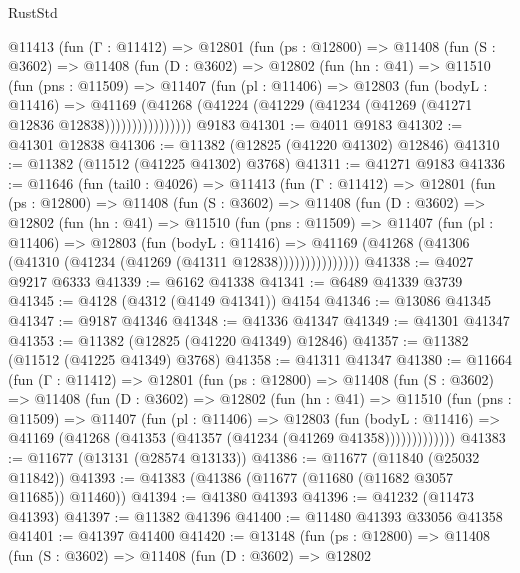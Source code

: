 \begin{lexlean}{RustStd}
\begin{coremodule}
      @11413
        (fun (Γ : @11412) =>
        @12801
          (fun (ps : @12800) =>
          @11408
            (fun (S : @3602) =>
            @11408
              (fun (D : @3602) =>
              @12802
                (fun (hn : @41) =>
                @11510
                  (fun (pns : @11509) =>
                  @11407
                    (fun (pl : @11406) =>
                    @12803
                      (fun (bodyL : @11416) =>
                      @41169
                        (@41268
                          (@41224 (@41229 (@41234 (@41269 (@41271 @12836 @12838))))))))))))))))
    @9183
@41301 := @4011 @9183
@41302 := @41301 @12838
@41306 := @11382 (@12825 (@41220 @41302) @12846)
@41310 := @11382 (@11512 (@41225 @41302) @3768)
@41311 := @41271 @9183
@41336 := @11646
    (fun (tail0 : @4026) =>
    @11413
      (fun (Γ : @11412) =>
      @12801
        (fun (ps : @12800) =>
        @11408
          (fun (S : @3602) =>
          @11408
            (fun (D : @3602) =>
            @12802
              (fun (hn : @41) =>
              @11510
                (fun (pns : @11509) =>
                @11407
                  (fun (pl : @11406) =>
                  @12803
                    (fun (bodyL : @11416) =>
                    @41169 (@41268 (@41306 (@41310 (@41234 (@41269 (@41311 @12838)))))))))))))))
@41338 := @4027 @9217 @6333
@41339 := @6162 @41338
@41341 := @6489 @41339 @3739
@41345 := @4128 (@4312 (@4149 @41341)) @4154
@41346 := @13086 @41345
@41347 := @9187 @41346
@41348 := @41336 @41347
@41349 := @41301 @41347
@41353 := @11382 (@12825 (@41220 @41349) @12846)
@41357 := @11382 (@11512 (@41225 @41349) @3768)
@41358 := @41311 @41347
@41380 := @11664
    (fun (Γ : @11412) =>
    @12801
      (fun (ps : @12800) =>
      @11408
        (fun (S : @3602) =>
        @11408
          (fun (D : @3602) =>
          @12802
            (fun (hn : @41) =>
            @11510
              (fun (pns : @11509) =>
              @11407
                (fun (pl : @11406) =>
                @12803
                  (fun (bodyL : @11416) =>
                  @41169 (@41268 (@41353 (@41357 (@41234 (@41269 @41358)))))))))))))
@41383 := @11677 (@13131 (@28574 @13133))
@41386 := @11677 (@11840 (@25032 @11842))
@41393 := @41383 (@41386 (@11677 (@11680 (@11682 @3057 @11685)) @11460))
@41394 := @41380 @41393
@41396 := @41232 (@11473 @41393)
@41397 := @11382 @41396
@41400 := @11480 @41393 @33056 @41358
@41401 := @41397 @41400
@41420 := @13148
    (fun (ps : @12800) =>
    @11408
      (fun (S : @3602) =>
      @11408
        (fun (D : @3602) =>
        @12802

\end{coremodule}
\end{lexlean}
